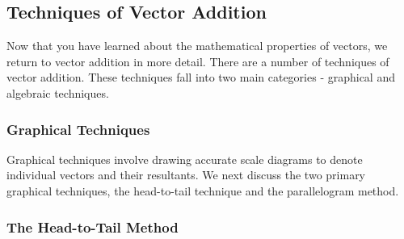     
    
    
    
    
  
    \label{m38815*cid8}
            \subsection{ Techniques of Vector Addition}
            \nopagebreak
            
      
      \label{m38815*id189251}Now that you have learned about the mathematical properties of
vectors, we return to vector addition in more detail. There are a number of
techniques of vector addition. These techniques fall into two main categories - graphical and algebraic techniques.\par 
      \label{m38815*uid38}
            \subsubsection{ Graphical Techniques}
            \nopagebreak
            
        
        \label{m38815*id189266}Graphical techniques involve drawing accurate scale diagrams to denote
individual vectors and their resultants. We next discuss the two primary
graphical techniques, the head-to-tail technique and the parallelogram
method.\par 
        \label{m38815*uid39}
            \subsubsection{ The Head-to-Tail Method}
            \nopagebreak
            

